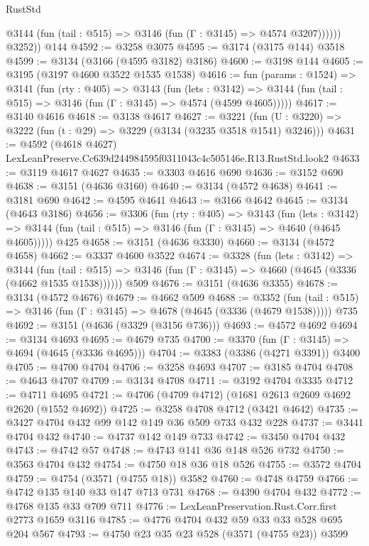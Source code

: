\begin{lexlean}{RustStd}
\begin{coremodule}
              @3144 (fun (tail : @515) => @3146 (fun (Γ : @3145) => @4574 @3207))))))
        @3252))
    @144
@4592 := @3258 @3075
@4595 := @3174 (@3175 @144) @3518
@4599 := @3134 (@3166 (@4595 @3182) @3186)
@4600 := @3198 @144
@4605 := @3195 (@3197 @4600 @3522 @1535 @1538)
@4616 := fun (params : @1524) =>
  @3141
    (fun (rty : @405) =>
    @3143
      (fun (lets : @3142) =>
      @3144 (fun (tail : @515) => @3146 (fun (Γ : @3145) => @4574 (@4599 @4605)))))
@4617 := @3140 @4616
@4618 := @3138 @4617
@4627 := @3221 (fun (U : @3220) => @3222 (fun (t : @29) => @3229 (@3134 (@3235 @3518 @1541) @3246)))
@4631 := @4592 (@4618 @4627) LexLeanPreserve.Cc639d244984595f0311043c4c505146e.R13.RustStd.look2
@4633 := @3119 @4617 @4627
@4635 := @3303 @4616 @690
@4636 := @3152 @690
@4638 := @3151 (@4636 @3160)
@4640 := @3134 (@4572 @4638)
@4641 := @3181 @690
@4642 := @4595 @4641
@4643 := @3166 @4642
@4645 := @3134 (@4643 @3186)
@4656 := @3306
    (fun (rty : @405) =>
    @3143
      (fun (lets : @3142) =>
      @3144 (fun (tail : @515) => @3146 (fun (Γ : @3145) => @4640 (@4645 @4605)))))
    @425
@4658 := @3151 (@4636 @3330)
@4660 := @3134 (@4572 @4658)
@4662 := @3337 @4600 @3522
@4674 := @3328
    (fun (lets : @3142) =>
    @3144
      (fun (tail : @515) => @3146 (fun (Γ : @3145) => @4660 (@4645 (@3336 (@4662 @1535 @1538))))))
    @509
@4676 := @3151 (@4636 @3355)
@4678 := @3134 (@4572 @4676)
@4679 := @4662 @509
@4688 := @3352
    (fun (tail : @515) => @3146 (fun (Γ : @3145) => @4678 (@4645 (@3336 (@4679 @1538)))))
    @735
@4692 := @3151 (@4636 (@3329 (@3156 @736)))
@4693 := @4572 @4692
@4694 := @3134 @4693
@4695 := @4679 @735
@4700 := @3370 (fun (Γ : @3145) => @4694 (@4645 (@3336 @4695)))
@4704 := @3383 (@3386 (@4271 @3391)) @3400
@4705 := @4700 @4704
@4706 := @3258 @4693
@4707 := @3185 @4704
@4708 := @4643 @4707
@4709 := @3134 @4708
@4711 := @3192 @4704 @3335
@4712 := @4711 @4695
@4721 := @4706 (@4709 @4712) (@1681 @2613 @2609 @4692 @2620 (@1552 @4692))
@4725 := @3258 @4708 @4712 (@3421 @4642)
@4735 := @3427 @4704 @432 @99 @142 @149 @36 @509 @733 @432 @228
@4737 := @3441 @4704 @432
@4740 := @4737 @142 @149 @733
@4742 := @3450 @4704 @432
@4743 := @4742 @57
@4748 := @4743 @141 @36 @148 @526 @732
@4750 := @3563 @4704 @432
@4754 := @4750 @18 @36 @18 @526
@4755 := @3572 @4704
@4759 := @4754 (@3571 (@4755 @18)) @3582
@4760 := @4748 @4759
@4766 := @4742 @135 @140 @33 @147 @713 @731
@4768 := @4390 @4704 @432
@4772 := @4768 @135 @33 @709 @711
@4776 := LexLeanPreservation.Rust.Corr.first @2773 @1659 @3116
@4785 := @4776 @4704 @432 @59 @33 @33 @528 @695 @204 @567
@4793 := @4750 @23 @35 @23 @528 (@3571 (@4755 @23)) @3599

\end{coremodule}
\end{lexlean}
